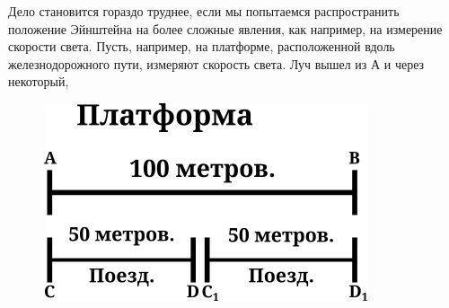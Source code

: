 Дело становится гораздо труднее, если мы попытаемся распространить положение Эйнштейна на более сложные явления, как например, на измерение скорости света. Пусть, например, на платформе, расположенной вдоль железнодорожного пути, измеряют скорость света. Луч вышел из А и через некоторый,
\begin{figure}[htp]
 \centering
 \includegraphics{2.png}
 \label{fig:1}
\end{figure}
